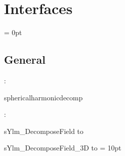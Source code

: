 
\section{Interfaces} 


\parskip = 0pt

\vspace{3mm} \subsection*{General}

: 

sphericalharmonicdecomp
\vspace{2mm}

\vspace{5mm}

: 



sYlm\_DecomposeField to 

sYlm\_DecomposeField\_3D to 
\vspace{2mm}\parskip = 10pt 
